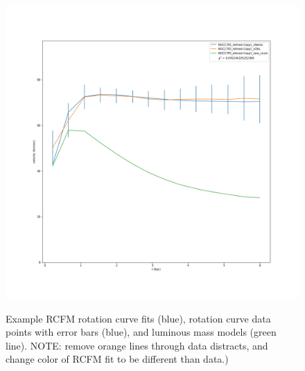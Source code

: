 \documentclass[reprint,%
 amsmath,amssymb,
 aps,
]{revtex4-1}
\begin{document}
\begin{figure}
\begin{minipage}{.5\textwidth}
  \label{fig:test2}
\end{minipage}
\begin{minipage}{.5\textwidth}
  \centering
  \includegraphics[width=.95\linewidth]{figures/NGC1705_rotmodXueSofue.png}
  \label{fig:test1}
\end{minipage}
 \caption{Example  RCFM rotation curve fits (blue), rotation curve data points with error bars (blue), and   luminous  mass models (green line). {\color{teal}NOTE: remove orange lines through data distracts, and change color of    RCFM fit to be different than data.)}  }
\end{figure}
 
\end{document}
